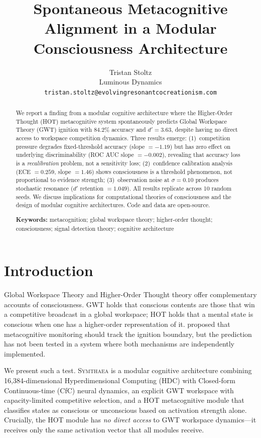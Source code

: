 \documentclass[10pt,letterpaper]{article}
\title{Spontaneous Metacognitive Alignment in a Modular\\
Consciousness Architecture}
\author{Tristan Stoltz\\
Luminous Dynamics\\
\texttt{tristan.stoltz@evolvingresonantcocreationism.com}}
\date{}
\newcommand{\symthaea}{\textsc{Symthaea}}
\newcommand{\dprime}{d'}
\begin{document}
\maketitle

\begin{abstract}
We report a finding from a modular cognitive architecture where the
Higher-Order Thought (HOT) metacognitive system spontaneously predicts
Global Workspace Theory (GWT) ignition with 84.2\% accuracy and
$\dprime = 3.63$, despite having no direct access to workspace
competition dynamics.  Three results emerge: (1)~competition pressure
degrades fixed-threshold accuracy (slope $= -1.19$) but has zero effect
on underlying discriminability (ROC AUC slope $= -0.002$), revealing
that accuracy loss is a \emph{recalibration} problem, not a sensitivity
loss; (2)~confidence calibration analysis (ECE $= 0.259$, slope $= 1.46$)
shows consciousness is a threshold phenomenon, not proportional to
evidence strength; (3)~observation noise at $\sigma = 0.10$ produces
stochastic resonance ($\dprime$ retention $= 1.049$).  All results
replicate across 10 random seeds.  We discuss implications for
computational theories of consciousness and the design of modular
cognitive architectures.  Code and data are open-source.

\medskip
\noindent\textbf{Keywords:} metacognition; global workspace theory;
higher-order thought; consciousness; signal detection theory;
cognitive architecture
\end{abstract}


\section{Introduction}

Global Workspace Theory \citep{baars1988cognitive,dehaene2001towards}
and Higher-Order Thought theory \citep{rosenthal2005consciousness} offer
complementary accounts of consciousness.  GWT holds that conscious
contents are those that win a competitive broadcast in a global
workspace; HOT holds that a mental state is conscious when one has a
higher-order representation of it.  \citet{lau2011empirical} proposed
that metacognitive monitoring should track the ignition boundary, but
the prediction has not been tested in a system where both mechanisms
are independently implemented.

We present such a test.  \symthaea{} is a modular cognitive architecture
combining 16,384-dimensional Hyperdimensional Computing (HDC) with
Closed-form Continuous-time (CfC) neural dynamics, an explicit GWT
workspace with capacity-limited competitive selection, and a HOT
metacognitive module that classifies states as conscious or unconscious
based on activation strength alone.  Crucially, the HOT module has
\emph{no direct access} to GWT workspace dynamics---it receives only
the same activation vector that all modules receive.
\end{document}
